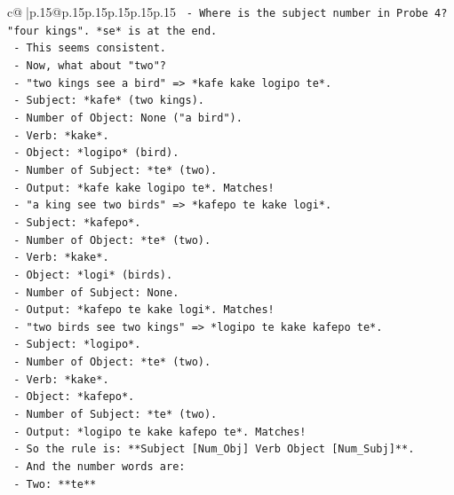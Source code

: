 \documentclass{article}
\begin{document}
{\begin{supertabular}{c@{$\;$}|p{.15\linewidth}@{}p{.15\linewidth}p{.15\linewidth}p{.15\linewidth}p{.15\linewidth}p{.15\linewidth}}
{{{\texttt{        {-} Where is the subject number in Probe 4? "four kings". *se* is at the end.} \\
\texttt{        {-} This seems consistent.} \\
\texttt{        {-} Now, what about "two"?} \\
\texttt{        {-} "two kings see a bird" => *kafe kake logipo te*.} \\
\texttt{          {-} Subject: *kafe* (two kings).} \\
\texttt{          {-} Number of Object: None ("a bird").} \\
\texttt{          {-} Verb: *kake*.} \\
\texttt{          {-} Object: *logipo* (bird).} \\
\texttt{          {-} Number of Subject: *te* (two).} \\
\texttt{          {-} Output: *kafe kake logipo te*. Matches!} \\
\texttt{        {-} "a king see two birds" => *kafepo te kake logi*.} \\
\texttt{          {-} Subject: *kafepo*.} \\
\texttt{          {-} Number of Object: *te* (two).} \\
\texttt{          {-} Verb: *kake*.} \\
\texttt{          {-} Object: *logi* (birds).} \\
\texttt{          {-} Number of Subject: None.} \\
\texttt{          {-} Output: *kafepo te kake logi*. Matches!} \\
\texttt{        {-} "two birds see two kings" => *logipo te kake kafepo te*.} \\
\texttt{          {-} Subject: *logipo*.} \\
\texttt{          {-} Number of Object: *te* (two).} \\
\texttt{          {-} Verb: *kake*.} \\
\texttt{          {-} Object: *kafepo*.} \\
\texttt{          {-} Number of Subject: *te* (two).} \\
\texttt{          {-} Output: *logipo te kake kafepo te*. Matches!} \\
\texttt{        {-} So the rule is: **Subject {[}Num\_Obj{]} Verb Object {[}Num\_Subj{]}**.} \\
\texttt{        {-} And the number words are:} \\
\texttt{          {-} Two: **te**} \\
}}}
\end{supertabular}}
\end{document}
